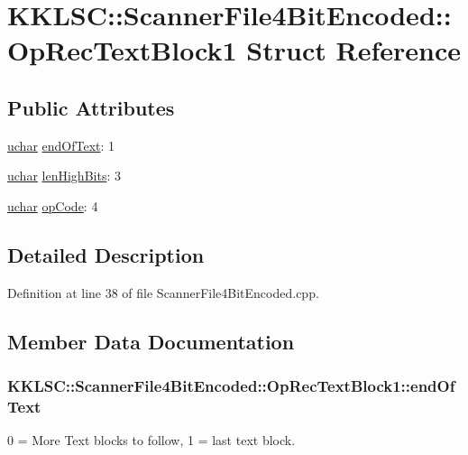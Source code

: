 \hypertarget{struct_scanner_file4_bit_encoded_1_1_op_rec_text_block1}{}\section{K\+K\+L\+SC\+:\+:Scanner\+File4\+Bit\+Encoded\+:\+:Op\+Rec\+Text\+Block1 Struct Reference}
\label{struct_scanner_file4_bit_encoded_1_1_op_rec_text_block1}
\subsection*{Public Attributes}
\begin{DoxyCompactItemize}
\item 
\hyperlink{namespace_k_k_b_ace9969169bf514f9ee6185186949cdf7}{uchar} \hyperlink{struct_scanner_file4_bit_encoded_1_1_op_rec_text_block1_a4b0da70cc98f5666ce4e86f3673e7e77}{end\+Of\+Text}\+: 1
\item 
\hyperlink{namespace_k_k_b_ace9969169bf514f9ee6185186949cdf7}{uchar} \hyperlink{struct_scanner_file4_bit_encoded_1_1_op_rec_text_block1_a8eaf8d2ce94039bebf05c35bcd544bd0}{len\+High\+Bits}\+: 3
\item 
\hyperlink{namespace_k_k_b_ace9969169bf514f9ee6185186949cdf7}{uchar} \hyperlink{struct_scanner_file4_bit_encoded_1_1_op_rec_text_block1_ab589dd24a36a39041276ccfef5ade8e7}{op\+Code}\+: 4
\end{DoxyCompactItemize}


\subsection{Detailed Description}


Definition at line 38 of file Scanner\+File4\+Bit\+Encoded.\+cpp.



\subsection{Member Data Documentation}
\subsubsection[{\texorpdfstring{end\+Of\+Text}{endOfText}}]{ K\+K\+L\+S\+C\+::\+Scanner\+File4\+Bit\+Encoded\+::\+Op\+Rec\+Text\+Block1\+::end\+Of\+Text}\hypertarget{struct_scanner_file4_bit_encoded_1_1_op_rec_text_block1_a4b0da70cc98f5666ce4e86f3673e7e77}{}\label{struct_scanner_file4_bit_encoded_1_1_op_rec_text_block1_a4b0da70cc98f5666ce4e86f3673e7e77}
0 = More Text blocks to follow, 1 = last text block. 

